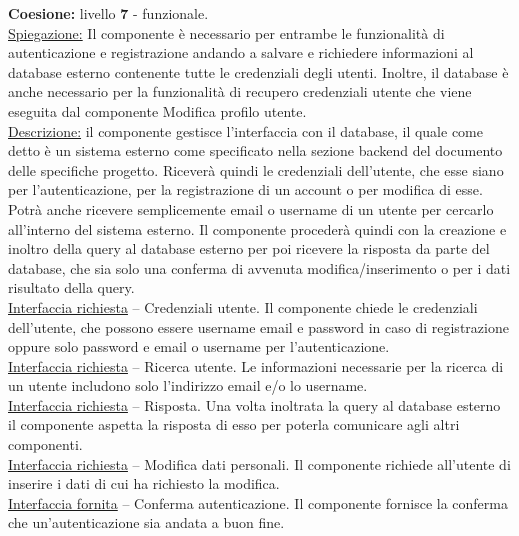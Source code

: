 \documentclass{article}
\begin{document}
      \textbf{Coesione:} livello \textbf{7} - funzionale.\\

      \underline{Spiegazione:} Il componente è necessario per entrambe le funzionalità di autenticazione e registrazione andando a salvare e richiedere informazioni al database esterno
      contenente tutte le credenziali degli utenti. Inoltre, il database è anche necessario per la funzionalità di recupero credenziali utente che viene eseguita dal componente
      Modifica profilo utente.\\

      \underline{Descrizione:} il componente gestisce l’interfaccia con il database, il quale come detto è un sistema esterno come specificato nella sezione backend del documento
      delle specifiche progetto. Riceverà quindi le credenziali dell’utente, che esse siano per l’autenticazione, per la registrazione di un account o per modifica di esse. Potrà anche
      ricevere semplicemente email o username di un utente per cercarlo all’interno del sistema esterno. Il componente procederà quindi con la creazione e inoltro della query al
      database esterno per poi ricevere la risposta da parte del database, che sia solo una conferma di avvenuta modifica/inserimento o per i dati risultato della query.\\

      \underline{Interfaccia richiesta} – Credenziali utente. Il componente chiede le credenziali dell’utente, che possono essere username email e password in caso di registrazione
      oppure solo password e email o username per l’autenticazione.\\

      \underline{Interfaccia richiesta} – Ricerca utente. Le informazioni necessarie per la ricerca di un utente includono solo l’indirizzo email e/o lo username.\\

      \underline{Interfaccia richiesta} – Risposta. Una volta inoltrata la query al database esterno il componente aspetta la risposta di esso per poterla comunicare agli altri
      componenti.\\

      \underline{Interfaccia richiesta} – Modifica dati personali. Il componente richiede all’utente di inserire i dati di cui ha richiesto la modifica.\\

      \underline{Interfaccia fornita} – Conferma autenticazione. Il componente fornisce la conferma che un’autenticazione sia andata a buon fine.\\
\end{document}
